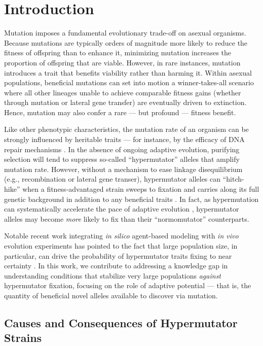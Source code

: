 \section{Introduction} \label{sec:introduction}

Mutation imposes a fundamental evolutionary trade-off on asexual organisms.
Because mutations are typically orders of magnitude more likely to reduce the fitness of offspring than to enhance it, minimizing mutation increases the proportion of offspring that are viable.
However, in rare instances, mutation introduces a trait that benefits viability rather than harming it.
Within asexual populations, beneficial mutations can set into motion a winner-takes-all scenario where all other lineages unable to achieve comparable fitness gains (whether through mutation or lateral gene transfer) are eventually driven to extinction.
Hence, mutation may also confer a rare --- but profound --- fitness benefit.

Like other phenotypic characteristics, the mutation rate of an organism can be strongly influenced by heritable traits --- for instance, by the efficacy of DNA repair mechanisms \citep{sniegowski2000evolution}.
In the absence of ongoing adaptive evolution, purifying selection will tend to suppress so-called ``hypermutator'' alleles that amplify mutation rate.
However, without a mechanism to ease linkage disequilibrium (e.g., recombination or lateral gene transer), hypermutator alleles can  ``hitch-hike'' when a fitness-advantaged strain sweeps to fixation and carries along its full genetic background in addition to any beneficial traits \citep{johnson1999beneficial}.
In fact, as hypermutation can systematically accelerate the pace of adaptive evolution \citep{orr2000rate}, hypermutator alleles may become \textit{more} likely to fix than their ``normomutator'' counterparts.

Notable recent work integrating \textit{in silico} agent-based modeling with \textit{in vivo} evolution experiments has pointed to the fact that large population size, in particular, can drive the probability of hypermutator traits fixing to near certainty \citep{raynes2018sign}.
In this work, we contribute to addressing a knowledge gap in understanding conditions that stabilize very large populations \textit{against} hypermutator fixation, focusing on the role of adaptive potential --- that is, the quantity of beneficial novel alleles available to discover via mutation.

\subsection{Causes and Consequences of Hypermutator Strains}

